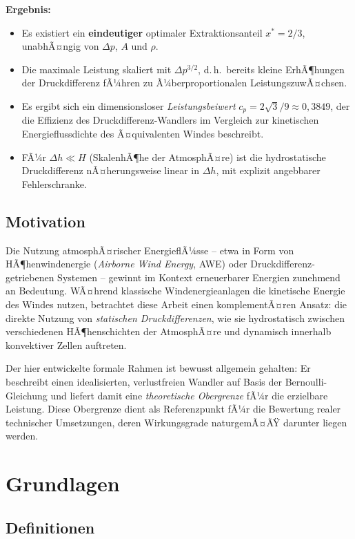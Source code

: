﻿\documentclass[a4paper,12pt]{article}
\theoremstyle{definition}
\begin{document}
\textbf{Ergebnis:}
\begin{itemize}
	\item Es existiert ein \textbf{eindeutiger} optimaler Extraktionsanteil
	$x^\ast = 2/3$, unabhÃ¤ngig von $\Delta p$, $A$ und $\rho$.
	\item Die maximale Leistung skaliert mit $\Delta p^{3/2}$, d.\,h.\
	bereits kleine ErhÃ¶hungen der Druckdifferenz fÃ¼hren zu
	Ã¼berproportionalen LeistungszuwÃ¤chsen.
	\item Es ergibt sich ein dimensionsloser \emph{Leistungsbeiwert}
	$c_p = 2\sqrt{3}/9 \approx 0{,}3849$, der die Effizienz des
	Druckdifferenz-Wandlers im Vergleich zur kinetischen
	Energieflussdichte des Ã¤quivalenten Windes beschreibt.
	\item FÃ¼r $\Delta h \ll H$ (SkalenhÃ¶he der AtmosphÃ¤re) ist die
	hydrostatische Druckdifferenz nÃ¤herungsweise linear in $\Delta h$,
	mit explizit angebbarer Fehlerschranke.
\end{itemize}

\subsection{Motivation}

Die Nutzung atmosphÃ¤rischer EnergieflÃ¼sse -- etwa in Form von
HÃ¶henwindenergie (\emph{Airborne Wind Energy}, AWE) oder
Druckdifferenz-getriebenen Systemen -- gewinnt im Kontext erneuerbarer
Energien zunehmend an Bedeutung. WÃ¤hrend klassische Windenergieanlagen die
kinetische Energie des Windes nutzen, betrachtet diese Arbeit einen
komplementÃ¤ren Ansatz: die direkte Nutzung von \emph{statischen
Druckdifferenzen}, wie sie hydrostatisch zwischen verschiedenen
HÃ¶henschichten der AtmosphÃ¤re und dynamisch innerhalb konvektiver Zellen
auftreten.

Der hier entwickelte formale Rahmen ist bewusst allgemein gehalten: Er
beschreibt einen idealisierten, verlustfreien Wandler auf Basis der
Bernoulli-Gleichung und liefert damit eine \emph{theoretische Obergrenze}
fÃ¼r die erzielbare Leistung. Diese Obergrenze dient als Referenzpunkt fÃ¼r
die Bewertung realer technischer Umsetzungen, deren Wirkungsgrade
naturgemÃ¤ÃŸ darunter liegen werden.

\section{Grundlagen}

\subsection{Definitionen}
\end{document}
